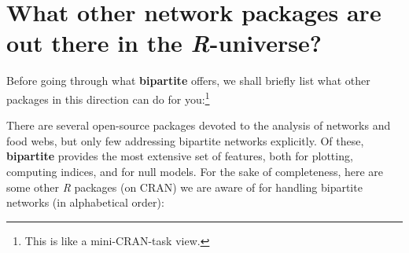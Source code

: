 \documentclass[a4paper, 11pt]{article}\usepackage[]{graphicx}\usepackage[]{color}
\newcommand{\package}[1]{\textbf{#1}}
\newcommand{\proglang}[1]{\textsl{#1}}
\begin{document}
\section{What other network packages are out there in the \proglang{R}-universe?}
Before going through what \package{bipartite} offers, we shall briefly list what other packages in this direction can do for you:\footnote{ This is like a mini-CRAN-task view.}

There are several open-source packages devoted to the analysis of networks and food webs, but only few addressing bipartite networks explicitly. Of these, \package{bipartite} provides the most extensive set of features, both for plotting, computing indices, and for null models. For the sake of completeness, here are some other \proglang{R} packages (on CRAN) we are aware of for handling bipartite networks (in alphabetical order):
\end{document}
